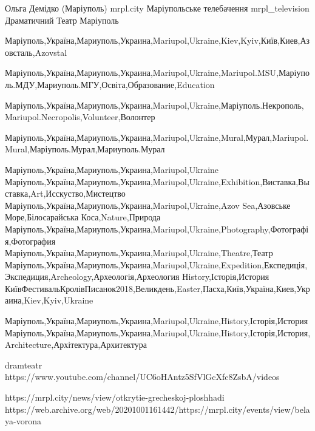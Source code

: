  
 
 
 
 

Ольга Демідко (Маріуполь)
mrpl.city
Маріупольське телебачення mrpl_television
Драматичний Театр Маріуполь

Маріуполь,Україна,Мариуполь,Украина,Mariupol,Ukraine,Kiev,Kyiv,Київ,Киев,Азовсталь,Azovstal

Маріуполь,Україна,Мариуполь,Украина,Mariupol,Ukraine,Mariupol.MSU,Маріуполь.МДУ,Мариуполь.МГУ,Освіта,Образование,Education

Маріуполь,Україна,Мариуполь,Украина,Mariupol,Ukraine,Маріуполь.Некрополь,Mariupol.Necropolis,Volunteer,Волонтер

Маріуполь,Україна,Мариуполь,Украина,Mariupol,Ukraine,Mural,Мурал,Mariupol.Mural,Маріуполь.Мурал,Мариуполь.Мурал

Маріуполь,Україна,Мариуполь,Украина,Mariupol,Ukraine
Маріуполь,Україна,Мариуполь,Украина,Mariupol,Ukraine,Exhibition,Виставка,Выставка,Art,Исскуство,Мистецтво
Маріуполь,Україна,Мариуполь,Украина,Mariupol,Ukraine,Azov Sea,Азовське Море,Білосарайська Коса,Nature,Природа
Маріуполь,Україна,Мариуполь,Украина,Mariupol,Ukraine,Photography,Фотографія,Фотография
Маріуполь,Україна,Мариуполь,Украина,Mariupol,Ukraine,Theatre,Театр
Маріуполь,Україна,Мариуполь,Украина,Mariupol,Ukraine,Expedition,Експедиція,Экспедиция,Archeology,Археологія,Археология
History,Історія,История
КиївФестивальКролівПисанок2018,Великдень,Easter,Пасха,Київ,Україна,Киев,Украина,Kiev,Kyiv,Ukraine

Маріуполь,Україна,Мариуполь,Украина,Mariupol,Ukraine,History,Історія,История
Маріуполь,Україна,Мариуполь,Украина,Mariupol,Ukraine,History,Історія,История,Architecture,Архітектура,Архитектура

dramteatr
https://www.youtube.com/channel/UC6oHAntz5SfVlGcXfc8ZsbA/videos

https://mrpl.city/news/view/otkrytie-grecheskoj-ploshhadi
https://web.archive.org/web/20201001161442/https://mrpl.city/events/view/belaya-vorona


